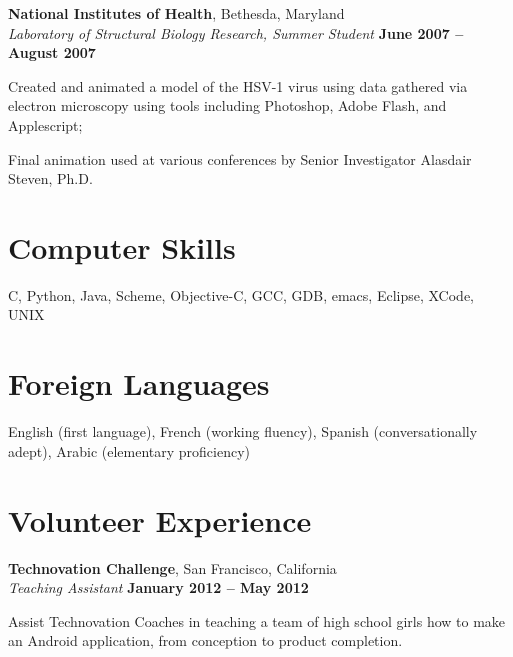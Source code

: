 \documentclass[margin,line]{resume}
\begin{document}
\begin{resume}
	\textbf{National Institutes of Health}, Bethesda, Maryland \vspace{1mm}\\\vspace{0mm}%
    \textsl{Laboratory of Structural Biology Research, Summer Student} \hfill \textbf{June 2007 -- August 2007}
	\begin{list2}
		\item Created and animated a model of the HSV-1 virus using data gathered via electron microscopy 
	using tools including Photoshop, Adobe Flash, and Applescript;
		\item Final animation used at various conferences by Senior Investigator Alasdair Steven, Ph.D.
	\end{list2}\vspace{-1.5mm}

    \section{\mysidestyle Computer Skills} 

    C, Python, Java, Scheme, Objective-C, GCC, GDB, emacs, Eclipse, XCode, UNIX
	

		\section{\mysidestyle Foreign Languages}

		English (first language), French (working fluency), Spanish (conversationally adept), 
		Arabic (elementary proficiency)

	\section{\mysidestyle Volunteer Experience}
	
	\textbf{Technovation Challenge}, San Francisco, California \vspace{1mm}\\\vspace{0mm}%
	\textsl{Teaching Assistant} \hfill \textbf{January 2012 -- May 2012}\vspace{0mm}\vspace{0mm}%
	\begin{list2}
		\item Assist Technovation Coaches in teaching a team of high school girls how to make an Android application, from conception to product completion.
	\end{list2}
	

\end{resume}
\end{document}
